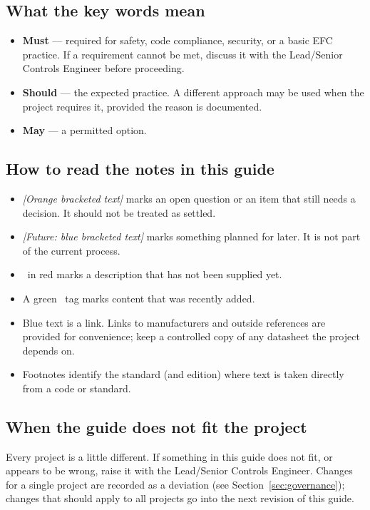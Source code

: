 \subsection*{What the key words mean}
\begin{itemize}[itemsep=2pt]
  \item \textbf{Must} --- required for safety, code compliance, security, or a basic EFC practice. If a requirement cannot be met, discuss it with the Lead/Senior Controls Engineer before proceeding.
  \item \textbf{Should} --- the expected practice. A different approach may be used when the project requires it, provided the reason is documented.
  \item \textbf{May} --- a permitted option.
\end{itemize}

\subsection*{How to read the notes in this guide}
\begin{itemize}[itemsep=2pt]
  \item \textit{\textcolor{noteorange}{[Orange bracketed text]}} marks an open question or an item that still needs a decision. It should not be treated as settled.
  \item \textit{\textcolor{futureblue}{[Future: blue bracketed text]}} marks something planned for later. It is not part of the current process.
  \item \tbd\ in red marks a description that has not been supplied yet.
  \item A green \newmark\ tag marks content that was recently added.
  \item Blue text is a link. Links to manufacturers and outside references are provided for convenience; keep a controlled copy of any datasheet the project depends on.
  \item Footnotes identify the standard (and edition) where text is taken directly from a code or standard.
\end{itemize}

\subsection*{When the guide does not fit the project}
Every project is a little different. If something in this guide does not fit, or appears to be wrong, raise it with the Lead/Senior Controls Engineer. Changes for a single project are recorded as a deviation (see Section~\ref{sec:governance}); changes that should apply to all projects go into the next revision of this guide.

